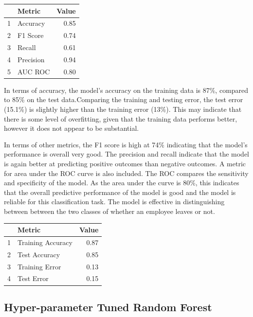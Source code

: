 \documentclass[11pt,preprint, authoryear]{elsarticle}
\let\origtable\table
\let\endorigtable\endtable
\renewenvironment{table}[1][2] {
    \expandafter\origtable\expandafter[H]
} {
    \endorigtable
}
\numberwithin{equation}{section}
\numberwithin{figure}{section}
\numberwithin{table}{section}
\begin{document}
\begin{table}[H]
\centering
\begin{tabular}{rlr}
  \hline
 & Metric & Value \\ 
  \hline
1 & Accuracy & 0.85 \\ 
  2 & F1 Score & 0.74 \\ 
  3 & Recall & 0.61 \\ 
  4 & Precision & 0.94 \\ 
  5 & AUC ROC & 0.80 \\ 
   \hline
\end{tabular}
\caption{Metrics for Baseline Random Forest \label{tab1}} 
\end{table}

In terms of accuracy, the model's accuracy on the training data is 87\%,
compared to 85\% on the test data.Comparing the training and testing
error, the test error (15.1\%) is slightly higher than the training
error (13\%). This may indicate that there is some level of overfitting,
given that the training data performs better, however it does not appear
to be substantial.

In terms of other metrics, the F1 score is high at 74\% indicating that
the model's performance is overall very good. The precision and recall
indicate that the model is again better at predicting positive outcomes
than negative outcomes. A metric for area under the ROC curve is also
included. The ROC compares the sensitivity and specificity of the model.
As the area under the curve is 80\%, this indicates that the overall
predictive performance of the model is good and the model is reliable
for this classification task. The model is effective in distinguishing
between between the two classes of whether an employee leaves or not.

\begin{table}[H]
\centering
\begin{tabular}{rlr}
  \hline
 & Metric & Value \\ 
  \hline
1 & Training Accuracy & 0.87 \\ 
  2 & Test Accuracy & 0.85 \\ 
  3 & Training Error & 0.13 \\ 
  4 & Test Error & 0.15 \\ 
   \hline
\end{tabular}
\caption{More Metrics for Baseline Random Forest \label{tab1}} 
\end{table}

\hypertarget{hyper-parameter-tuned-random-forest}{%
\subsection{Hyper-parameter Tuned Random
Forest}\label{hyper-parameter-tuned-random-forest}}
\end{document}
